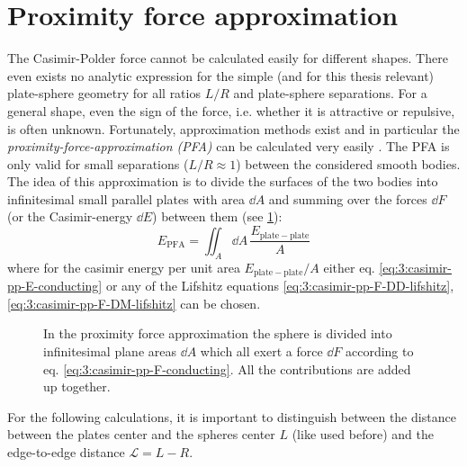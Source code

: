 \section{Proximity force approximation}
The Casimir-Polder force cannot be calculated easily for different shapes. There even exists no analytic expression for the simple (and for this thesis relevant) plate-sphere geometry for all ratios $L/R$ and plate-sphere separations.
For a general shape, even the sign of the force, i.e. whether it is attractive or repulsive, is often unknown.
Fortunately, approximation methods exist and in particular the \emph{proximity-force-approximation (PFA)} can be calculated very easily \cite{Hartmann_2018,Emig_2007a,Bulgac_2006}.
The PFA is only valid for small separations ($L/R \approx 1$) between the considered smooth bodies.
The idea of this approximation is to divide the surfaces of the two bodies into infinitesimal small parallel plates with area $\dd A$ and summing over the forces $\dd F$ (or the Casimir-energy $\dd E$) between them (see \cref{fig:3:PFA}):
\begin{equation}\label{eq:3:pfa}
  E_\mathrm{PFA} = \iint_A \dd A \, \frac{E_\mathrm{plate-plate}}{A}
\end{equation}
where for the casimir energy per unit area $E_\mathrm{plate-plate}/A$ either eq. \eqref{eq:3:casimir-pp-E-conducting} or any of the Lifshitz equations \eqref{eq:3:casimir-pp-F-DD-lifshitz}, \eqref{eq:3:casimir-pp-F-DM-lifshitz} can be chosen.
\begin{figure}[!htbp]
  \centering
  \def\svgwidth{0.55\textwidth}
  
  \caption{In the proximity force approximation the sphere is divided into infinitesimal plane areas $\dd A$ which all exert a force $\dd F$ according to eq. \eqref{eq:3:casimir-pp-F-conducting}. All the contributions are added up together.}
  \label{fig:3:PFA}
\end{figure}
For the following calculations, it is important to distinguish between the distance between the plates center and the spheres center $L$ (like used before) and the edge-to-edge distance $\mathscr{L} = L - R$.

